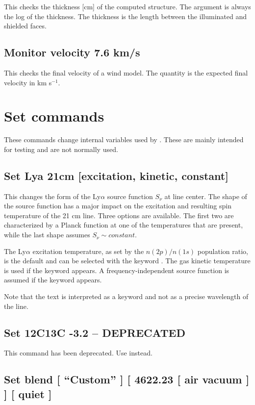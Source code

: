 This checks the thickness [cm] of the computed structure.
The argument
is always the log of the thickness.
The thickness is the length between
the illuminated and shielded faces.

\subsection{Monitor velocity 7.6 km/s}

This checks the final velocity of a wind model.
The quantity is the
expected final velocity in km s$^{-1}$.

\section{Set commands}

These commands change internal variables used by \Cloudy.
These are mainly
intended for testing and are not normally used.

\subsection{Set Lya 21cm [excitation, kinetic, constant]}
This changes the form of the Ly$\alpha$ source function $S_{\nu}$ at line center.
The shape of the source function has a major impact on the excitation
and resulting spin temperature of the 21 cm line.
Three options are available.  The first two are characterized by a Planck function
at one of the temperatures that are present, while the last shape assumes $S_{\nu} \sim constant$.

The Ly$\alpha$ excitation temperature, as set by the $n(2p)/n(1s)$ population ratio, is the default
and can be selected with the keyword .
The gas kinetic temperature is used if the keyword  appears.
A frequency-independent source function is assumed if the keyword  appears.

Note that the text \cdCommand{21cm} is interpreted as a keyword and not as a precise wavelength
of the line.

\subsection{Set 12C13C -3.2 -- DEPRECATED}

This command has been deprecated.
Use  instead.

\subsection{Set blend [ ``Custom'' ] [ 4622.23 [ air \OR{} vacuum ] ] [ quiet ]}

